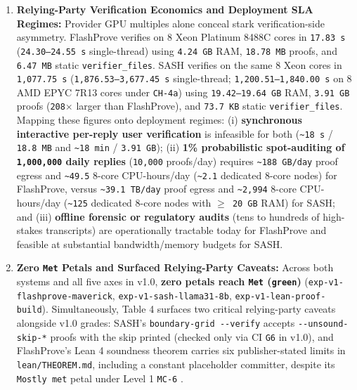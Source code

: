 \documentclass[11pt,letterpaper]{article}
\begin{document}
\begin{enumerate}
\item \textbf{Relying-Party Verification Economics and Deployment SLA Regimes:} Provider GPU multiples alone conceal stark verification-side asymmetry. FlashProve verifies on 8 Xeon Platinum 8488C cores in \texttt{17.83 s} (\texttt{24.30--24.55 s} single-thread) using \texttt{4.24 GB} RAM, \texttt{18.78 MB} proofs, and \texttt{6.47 MB} static \texttt{verifier\_\allowbreak{}files}. SASH verifies on the same 8 Xeon cores in \texttt{1,077.75 s} (\texttt{1,876.53--3,677.45 s} single-thread; \texttt{1,200.51--1,840.00 s} on 8 AMD EPYC 7R13 cores under \texttt{CH-4a}) using \texttt{19.42--19.64 GB} RAM, \texttt{3.91 GB} proofs (\texttt{208$\times$} larger than FlashProve), and \texttt{73.7 KB} static \texttt{verifier\_\allowbreak{}files}. Mapping these figures onto deployment regimes: (i) \textbf{synchronous interactive per-reply user verification} is infeasible for both (\texttt{\textasciitilde{}18 s} / \texttt{18.8 MB} and \texttt{\textasciitilde{}18 min} / \texttt{3.91 GB}); (ii) \textbf{1\% probabilistic spot-auditing of \texttt{1,000,000} daily replies} (\texttt{10,000} proofs/day) requires \texttt{\textasciitilde{}188 GB/\allowbreak{}day} proof egress and \texttt{\textasciitilde{}49.5} 8-core CPU-hours/day (\texttt{\textasciitilde{}2.1} dedicated 8-core nodes) for FlashProve, versus \texttt{\textasciitilde{}39.1 TB/\allowbreak{}day} proof egress and \texttt{\textasciitilde{}2,994} 8-core CPU-hours/day (\texttt{\textasciitilde{}125} dedicated 8-core nodes with \texttt{$\ge$ 20 GB} RAM) for SASH; and (iii) \textbf{offline forensic or regulatory audits} (tens to hundreds of high-stakes transcripts) are operationally tractable today for FlashProve and feasible at substantial bandwidth/memory budgets for SASH.
\item \textbf{Zero \texttt{Met} Petals and Surfaced Relying-Party Caveats:} Across both systems and all five axes in v1.0, \textbf{zero petals reach \texttt{Met} (\texttt{green})} (\texttt{exp-\allowbreak{}v1-\allowbreak{}flashprove-\allowbreak{}maverick}, \texttt{exp-\allowbreak{}v1-\allowbreak{}sash-\allowbreak{}llama31-8b}, \texttt{exp-\allowbreak{}v1-\allowbreak{}lean-\allowbreak{}proof-\allowbreak{}build}). Simultaneously, Table 4 surfaces two critical relying-party caveats alongside v1.0 grades: SASH's \texttt{boundary-\allowbreak{}grid -{}-verify} accepts \texttt{-{}-unsound-\allowbreak{}skip-*} proofs with the skip printed (checked only via CI \texttt{G6} in v1.0), and FlashProve's Lean 4 soundness theorem carries six publisher-stated limits in \texttt{lean/\allowbreak{}THEOREM.\allowbreak{}md}, including a constant placeholder committer, despite its \texttt{Mostly met} petal under Level 1 \texttt{MC-6} \cite{iproofs2026,rinberg2026flashprove,sash2026}.
\end{enumerate}
\end{document}
